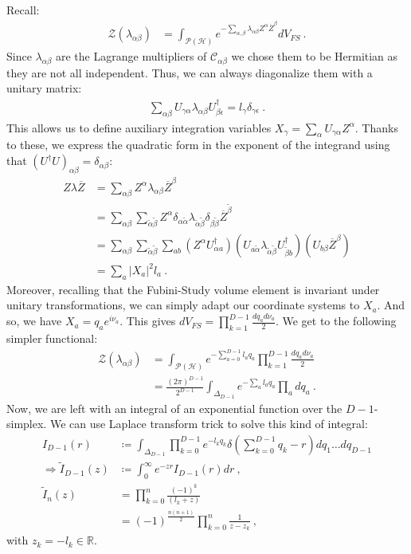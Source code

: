 \documentclass[draft,nofootinbib,pre,twocolumn,showpacs,showkeys,groupaddress,preprintnumbers,floatfix]{revtex4-1}
\newcommand{\1}{\mathbbm{1}}
\begin{document}
Recall:
\begin{align*}
\mathcal{Z}\left(\lambda_{\alpha\beta}\right)
  & = \int_{\mathcal{P}(\mathcal{H})}
  e^{- \sum_{\alpha,\beta} \lambda_{\alpha\beta}Z^\alpha \overline{Z}^\beta} dV_{FS} 
  ~.
\end{align*}
Since $\lambda_{\alpha\beta}$ are the Lagrange multipliers of
$\mathcal{C}_{\alpha\beta}$ we chose them to be Hermitian as they are not all
independent. Thus, we can always diagonalize them with a unitary matrix:
\begin{align*}
\sum_{\alpha \beta} U_{\gamma \alpha}\lambda_{\alpha\beta}U^{\dagger}_{\beta \epsilon} = l_\gamma \delta_{\gamma \epsilon}
  ~.
\end{align*}
This allows us to define auxiliary integration variables $X_\gamma =
\sum_{\alpha} U_{\gamma \alpha}Z^\alpha$. Thanks to these, we express the
quadratic form in the exponent of the integrand using that $(U^\dagger
U)_{\alpha \beta} = \delta_{\alpha \beta}$:
\begin{align*}
Z \lambda \overline{Z}
  & = \sum_{\alpha \beta}Z^\alpha \lambda_{\alpha \beta}\overline{Z}^\beta \\
  & = \sum_{\alpha \beta} \sum_{\tilde{\alpha} \tilde{\beta}}Z^\alpha
  \delta_{\alpha \tilde{\alpha}} \lambda_{\tilde{\alpha}
  \tilde{\beta}}\delta_{\beta \tilde{\beta}}\overline{Z}^{\tilde{\beta}} \\
  & = \sum_{\alpha \beta} \sum_{\tilde{\alpha} \tilde{\beta}} \sum_{ab}
  \left(Z^\alpha U^\dagger_{\alpha a}\right) \left( U_{a\tilde{\alpha}}
  \lambda_{\tilde{\alpha}\tilde{\beta}} U^\dagger_{\tilde{\beta}b}\right)
  \left( U_{b\beta}\overline{Z}^\beta\right) \\
  & = \sum_a \left\vert X_a \right\vert^2 l_a
  ~.
\end{align*}
Moreover, recalling that the Fubini-Study volume element is invariant under
unitary transformations, we can simply adapt our coordinate systems to $X_a$.
And so, we have $X_a = q_a e^{i\nu_a}$. This gives $dV_{FS} =
\prod_{k=1}^{D-1}\frac{dq_a d\nu_a}{2}$. We get to the following simpler
functional:
\begin{align*}
\mathcal{Z}\left(\lambda_{\alpha\beta}\right)
  & = \int_{\mathcal{P}(\mathcal{H})} e^{- \sum_{a=0}^{D-1} l_a q_a}
  \prod_{k=1}^{D-1}\frac{dq_a d\nu_a}{2} \\
  & = \frac{(2\pi)^{D-1}}{2^{D-1}} \int_{\Delta_{D-1}} e^{-\sum_a l_a q_a} \prod_a dq_a
  ~.
\end{align*}
Now, we are left with an integral of an exponential function over the $D-1$-simplex. We can use Laplace transform trick to solve this kind of integral:
\begin{align*}
I_{D-1}(r)
  & \coloneqq \int_{\Delta_{D-1}} \prod_{k=0}^{D-1} e^{- l_k q_k} \delta
  \left(\sum_{k=0}^{D-1} q_k-r\right) dq_1 \ldots dq_{D-1} \\
  \Rightarrow 
  \tilde{I}_{D-1}(z) & \coloneqq \int_0^{\infty} e^{-zr}I_{D-1}(r) dr ~,\\
\tilde{I}_n(z) & = \prod_{k=0}^n \frac{(-1)^k}{( l_k + z)} \\
  & = (-1)^{\frac{n(n+1)}{2}} \prod_{k=0}^n \frac{1}{z-z_k}
  ~,
\end{align*}
with $z_k = - l_k \in \mathbb{R}$.
\end{document}
